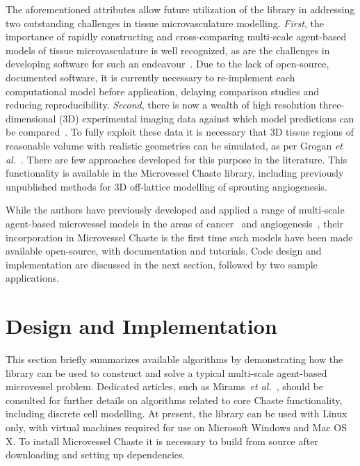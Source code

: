 \documentclass[10pt,letterpaper]{article}
\begin{document}
The aforementioned attributes allow future utilization of the library in addressing two outstanding challenges in tissue microvasculature modelling. \emph{First}, the importance of rapidly constructing and cross-comparing multi-scale agent-based models of tissue microvasculature is well recognized, as are the challenges in developing software for such an endeavour~\cite{Rieger2015, Connor2012}. Due to the lack of open-source, documented software, it is currently necessary to re-implement each computational model before application, delaying comparison studies and reducing reproducibility. \emph{Second}, there is now a wealth of high resolution three-dimensional (3D) experimental imaging data against which model predictions can be compared~\cite{Tozer2004}. To fully exploit these data it is necessary that 3D tissue regions of reasonable volume with realistic geometries can be simulated, as per Grogan \emph{et al.}~\cite{Grogan2016}. There are few approaches developed for this purpose in the literature. This functionality is available in the Microvessel Chaste library, including previously unpublished methods for 3D off-lattice modelling of sprouting angiogenesis.  

While the authors have previously developed and applied a range of multi-scale agent-based microvessel models in the areas of cancer~\cite{Alarcon2006, Perfahl2011, Grogan2016} and angiogenesis~\cite{Connor2015}, their incorporation in Microvessel Chaste is the first time such models have been made available open-source, with documentation and tutorials. Code design and implementation are discussed in the next section, followed by two sample applications. 	

\section*{Design and Implementation}

This section briefly summarizes available algorithms by demonstrating how the library can be used to construct and solve a typical multi-scale agent-based microvessel problem. Dedicated articles, such as Mirams~\emph{et al.}~\cite{Mirams2013}, should be consulted for further details on algorithms related to core Chaste functionality, including discrete cell modelling. At present, the library can be used with Linux only, with virtual machines required for use on Microsoft Windows and Mac OS X. To install Microvessel Chaste it is necessary to build from source after downloading and setting up dependencies. 
\end{document}
